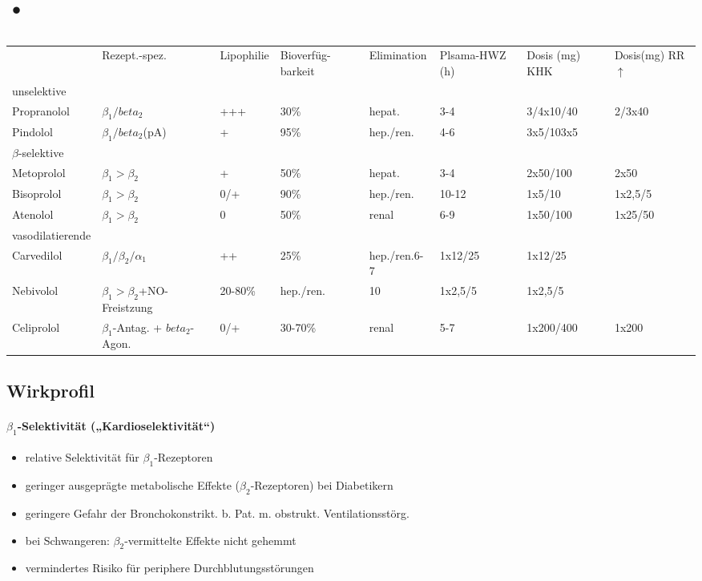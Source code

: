 \documentclass[10pt,a4paper]{report}
\begin{document}
\section{•}
\begin{table}[htbp]
\caption{}
\begin{tabularx}{\textwidth}{XXXXXXXX}
&Rezept.-spez.&Lipophilie&Bioverfüg-barkeit&Elimination&Plsama-HWZ (h)&Dosis (mg) KHK&Dosis(mg) RR$\uparrow$\\
unselektive&&&&&&\\
Propranolol&$\beta_1/beta_2$&+++& 30\%&hepat.&3-4&3/4x10/40&2/3x40\\
Pindolol&$\beta_1/beta_2$(pA)&+&95\%&hep./ren.&4-6&3x5/103x5\\
$\beta$-selektive&&&&&&&\\
Metoprolol&$\beta_1>\beta_2$&+&50\%&hepat.&3-4&2x50/100&2x50\\
Bisoprolol&$\beta_1>\beta_2$&0/+&90\%&hep./ren.&10-12&1x5/10&1x2,5/5\\
Atenolol&$\beta_1>\beta_2$&0&50\%&renal&6-9&1x50/100&1x25/50\\
vasodilatierende&&&&&&&\\
Carvedilol&$\beta_1/\beta_2/\alpha_1$&++&25\%&hep./ren.6-7&1x12/25&1x12/25\\
Nebivolol&$\beta_1>\beta_2$+NO-Freistzung&20-80\%&hep./ren.&10&1x2,5/5&1x2,5/5\\
Celiprolol&$\beta_1$-Antag. + $beta_2$-Agon.&0/+&30-70\%&renal&5-7&1x200/400&1x200\\
\end{tabularx}
\label{}
\end{table}
\subsection{Wirkprofil}
\paragraph{$\beta_1$-Selektivität („Kardioselektivität“)}
\begin{itemize}
	\item relative Selektivität für $\beta_1$-Rezeptoren 
	\item geringer ausgeprägte metabolische Effekte ($\beta_2$-Rezeptoren) bei Diabetikern 
	\item geringere Gefahr der Bronchokonstrikt. b. Pat. m. obstrukt. Ventilationsstörg.
	\item  bei Schwangeren: $\beta_2$-vermittelte Effekte nicht gehemmt
	\item vermindertes Risiko für periphere Durchblutungsstörungen
\end{itemize}
\end{document}
